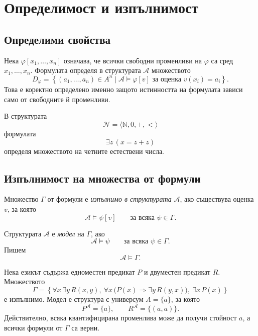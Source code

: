 \section{Определимост и изпълнимост}\label{s:21.5}

\subsection{Определими свойства}\label{s:21.5.1}

Нека $\varphi[x_1,\ldots,x_n]$ означава, че всички свободни променливи на $\varphi$ са сред $x_1,\ldots,x_n$. Формулата определя в структурата $\mathcal A$ множеството
\[
D_\varphi=
\left\{
(a_1,\ldots,a_n)\in A^n
\mid
\mathcal A\models\varphi[v]
\text{ за оценка }v(x_i)=a_i
\right\}.
\]
Това е коректно определено именно защото истинността на формулата зависи само от свободните й променливи.

\begin{example}
В структурата
\[
\mathcal N=\langle\mathbb N,0,+,<\rangle
\]
формулата
\[
\exists z\,(x=z+z)
\]
определя множеството на четните естествени числа.
\end{example}

\subsection{Изпълнимост на множества от формули}\label{s:21.5.2}

\begin{defn}
Множество $\Gamma$ от формули е \emph{изпълнимо в структурата} $\mathcal A$, ако съществува оценка $v$, за която
\[
\mathcal A\models\psi[v]
\qquad\text{за всяка }\psi\in\Gamma.
\]
\end{defn}

\begin{defn}
Структурата $\mathcal A$ е \emph{модел} на $\Gamma$, ако
\[
\mathcal A\models\psi
\qquad\text{за всяка }\psi\in\Gamma.
\]
Пишем
\[
\mathcal A\models\Gamma.
\]
\end{defn}

\begin{example}
Нека езикът съдържа едноместен предикат $P$ и двуместен предикат $R$. Множеството
\[
\Gamma=
\left\{
\forall x\,\exists y\,R(x,y),\
\forall x\,\bigl(P(x)\Rightarrow\exists y\,R(y,x)\bigr),\
\exists x\,P(x)
\right\}
\]
е изпълнимо. Модел е структура с универсум $A=\{a\}$, за която
\[
P^{\mathcal A}=\{a\},
\qquad
R^{\mathcal A}=\{(a,a)\}.
\]
Действително, всяка квантифицирана променлива може да получи стойност $a$, а всички формули от $\Gamma$ са верни.
\end{example}

